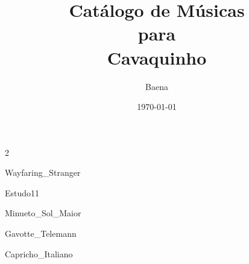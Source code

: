 \documentclass{scrartcl}
\begin{document}
\title{\textbf{\Huge Catálogo de Músicas\\ \vspace{1cm} para\\ \vspace{1cm} Cavaquinho}}
\author{Baena}
\date{\today}
\maketitle
\thispagestyle{empty}
\newpage

\setcounter{page}{1}

\begin{multicols}{2}
\tableofcontents
\end{multicols}

\cleardoublepage
{}
\setcounter{page}{1}







{Wayfaring_Stranger}




{Estudo11}


{Minueto_Sol_Maior}


{Gavotte_Telemann}








{Capricho_Italiano}
\end{document}
